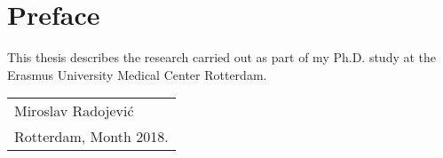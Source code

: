 %
% 

\chpos{14mm}{10mm}
\chapter*{Preface}




This thesis describes the research carried out as part of my Ph.D. study at the Erasmus University Medical Center Rotterdam. 
\bigskip
\begin{flushright}
  \begin{tabular}{@{}l@{}}
    Miroslav Radojevi\'{c}\\
    Rotterdam, Month 2018.
  \end{tabular}
\end{flushright}
